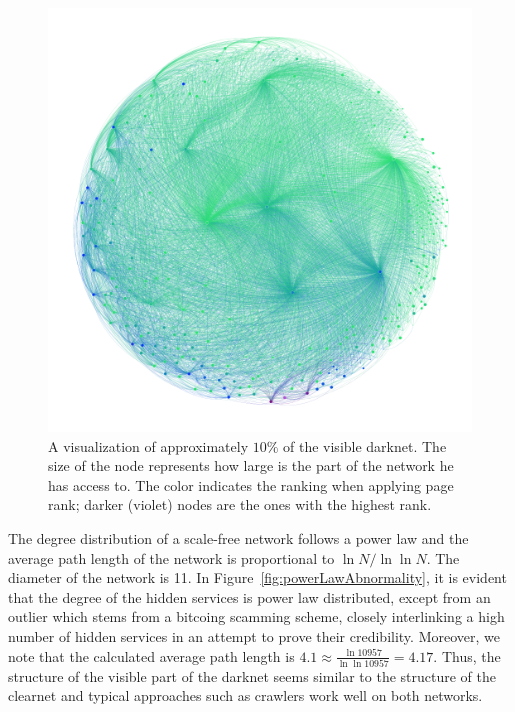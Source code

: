 \documentclass[USenglish,oneside,twocolumn]{article}
\begin{document}
\begin{figure}[t]
    \centering
    \includegraphics[width=0.8\linewidth]{images/ColorPageRankSizeStronglyConnected.png}
    \caption{A visualization of approximately $10\%$ of the visible darknet. The size of the node represents how large is the part of the network he has access to. The color indicates the ranking when applying page rank; darker (violet) nodes are the ones with the highest rank.}
    \label{fig:niceGraphImage}
\end{figure}
The degree distribution of a scale-free network follows a power law and the average path length of the network is proportional to $\ln{N}/\ln{\ln{N}}$. The diameter of the  network is 11. In Figure~\ref{fig:powerLawAbnormality}, it is evident that the degree of the hidden services is power law distributed, except from an outlier which stems from a bitcoing scamming scheme, closely interlinking a high number of hidden services in an attempt to prove their credibility. Moreover, we note that the calculated average path length is $4.1 \approx \frac{\ln 10957}{\ln\ln 10957} = 4.17$. 
Thus, the structure of the visible part of the darknet seems similar to the structure of the clearnet and typical approaches such as crawlers work well on both networks.
\end{document}
